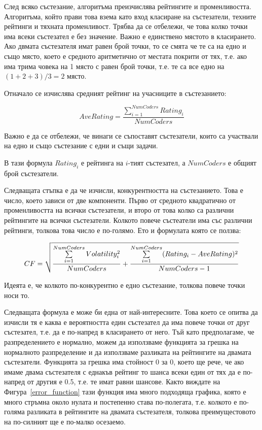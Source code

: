 \documentclass[a4paper,12pt]{article}
\begin{document}
  След всяко състезание, алгоритъма преизчислява рейтингите и променливостта. Алгоритъма, който прави това взема като вход класиране на състезатели, техните рейтинги и тяхната променливост. Трябва да се отбележи, че това колко точки има всеки състезател е без значение. Важно е единствено мястото в класирането. Ако двмата състезателя имат равен брой точки, то се смята че те са на едно и също място, което е средното аритметично от местата покрити от тях, т.е. ако има трима човека на 1 място с равен брой точки, т.е. те са все едно на \((1 + 2 + 3) / 3 = 2\) място.
  
  Отначало се изчислява средният рейтинг на учасниците в състезанието:
  
  \begin{equation} \label{eq:ave_rating}
    AveRating = \frac{\sum\limits_{i=1}^{NumCoders} Rating_{i}}{NumCoders}
  \end{equation}
  
  Важно е да се отбележи, че винаги се съпоставят състезатели, които са участвали на едно и също състезание с едни и същи задачи.
  
  В тази формула \(Rating_i\) е рейтинга на \(i\)-тият състезател, а \(NumCoders\) е общият брой състезатели.
  
  Следващата стъпка е да че изчисли, конкурентността на състезанието. Това е число, което зависи от две компоненти. Първо от средното квадратично от променливостта на всички състезатели, и второ от това колко са различни рейтингите на всички състезатели. Колкото повече състеатели има със различни рейтинги, толкова това число е по-голямо. Ето и формулата която се ползва: 
  
  \begin{equation}
    CF = \sqrt{\\
      \frac{\sum\limits_{i=1}^{NumCoders}Volatility_i^2}{NumCoders}\\
      +\\
      \frac{\sum\limits_{i=1}^{NumCoders}(Rating_i-AveRating)^2}{NumCoders - 1}\\
    }
  \end{equation}
  
  Идеята е, че колкото по-конкурентно е едно състезание, толкова повече точки носи то.
  
  Следващата формула е може би една от най-интересните. Това което се опитва да изчисли тя е каква е вероятността един състезател да има повече точки от друг състезател, т.е. да е по-напред в класирането от него. Тъй като предполагаме, че разпределението е нормално, можем да използваме функцията за грешка на нормалното разпределение и да използваме разликата на рейтингите на двамата състезатели. Функцията за грешка има стойност 0 за 0, което ще рече, че ако имаме двама състезателя с еднакъв рейтинг то шанса всеки един от тях да е по-напред от другия е 0.5, т.е. те имат равни шансове. Както виждате на Фигура~\ref{error_function} тази функция има много подходяща графика, която е много стръмна около нулата и постепенно става по-полегата, т.е. колкото е по-голяма разликата в рейтингите на двамата състезателя, толкова преимущестовото на по-силният ще е по-малко осезаемо.
  
\end{document}
